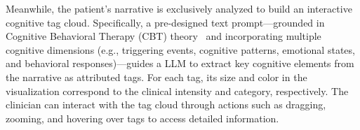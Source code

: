 \documentclass[]{interact}
\begin{document}
Meanwhile, the patient's narrative is exclusively analyzed to build an interactive cognitive tag cloud.
Specifically, a pre-designed text prompt—grounded in Cognitive Behavioral Therapy (CBT) theory~\cite{Hofmann2012} and incorporating multiple cognitive dimensions (e.g., triggering events, cognitive patterns, emotional states, and behavioral responses)—guides a LLM to extract key cognitive elements from the narrative as attributed tags. For each tag, its size and color in the visualization correspond to the clinical intensity and category, respectively. 
The clinician can interact with the tag cloud through actions such as dragging, zooming, and hovering over tags to access detailed information.
\end{document}
